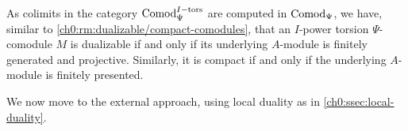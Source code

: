 \begin{remark}
    \label{ch0:rm:dualizable/compact-torsion-comodule}
    As colimits in the category $\mathrm{Comod}_\Psi^{I-\mathrm{tors}}$ are computed in $\mathrm{Comod}_\Psi$, we have, similar to \cref{ch0:rm:dualizable/compact-comodules}, that an $I$-power torsion $\Psi$-comodule $M$ is dualizable if and only if its underlying $A$-module is finitely generated and projective. Similarly, it is compact if and only if the underlying $A$-module is finitely presented. 
\end{remark}




We now move to the external approach, using local duality as in \cref{ch0:ssec:local-duality}. 

